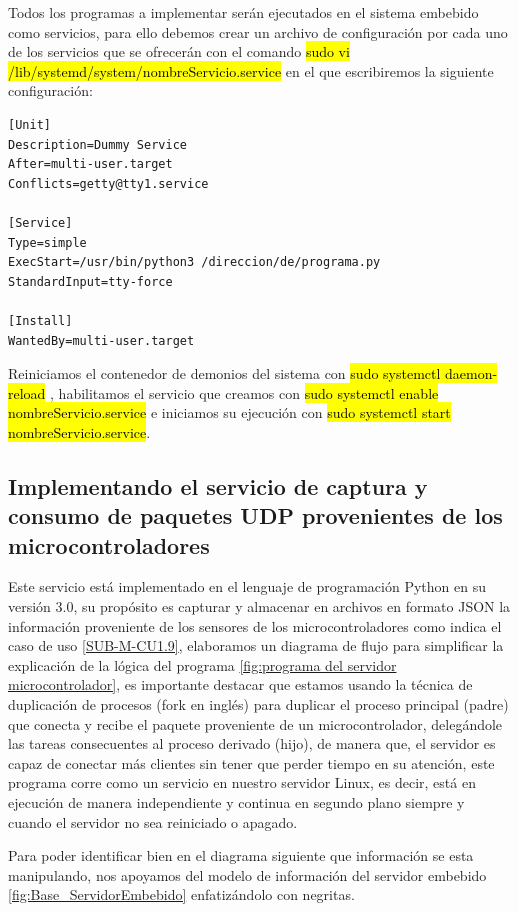 Todos los programas a implementar serán ejecutados en el sistema embebido como servicios, para ello debemos crear un archivo de configuración por cada uno de los servicios que se ofrecerán con el comando \hl{sudo vi /lib/systemd/system/nombreServicio.service} en el que escribiremos la siguiente configuración:

\begin{lstlisting}
[Unit]
Description=Dummy Service
After=multi-user.target
Conflicts=getty@tty1.service

[Service]
Type=simple
ExecStart=/usr/bin/python3 /direccion/de/programa.py
StandardInput=tty-force

[Install]
WantedBy=multi-user.target
\end{lstlisting}

Reiniciamos el contenedor de demonios del sistema con \hl{sudo systemctl daemon-reload} , habilitamos el servicio que creamos con \hl{sudo systemctl enable nombreServicio.service} e iniciamos su ejecución con \hl{sudo systemctl start nombreServicio.service}.

\subsection{Implementando el servicio de captura y consumo de paquetes UDP provenientes de los microcontroladores}

Este servicio está implementado en el lenguaje de programación Python en su versión 3.0, su propósito es capturar y almacenar en archivos en formato JSON la información proveniente de los sensores de los microcontroladores como indica el caso de uso \ref{SUB-M-CU1.9}, elaboramos un diagrama de flujo para simplificar la explicación de la lógica del programa \ref{fig:programa del servidor microcontrolador}, es importante destacar que estamos usando la técnica de duplicación de procesos (fork en inglés) para duplicar el proceso principal (padre) que conecta y recibe el paquete proveniente de un microcontrolador, delegándole las tareas consecuentes al proceso derivado (hijo), de manera que, el servidor es capaz de conectar más clientes sin tener que perder tiempo en su atención, este programa corre como un servicio en nuestro servidor Linux, es decir, está en ejecución de manera independiente y continua en segundo plano siempre y cuando el servidor no sea reiniciado o apagado.

Para poder identificar bien en el diagrama siguiente que información se esta manipulando, nos apoyamos del modelo de información del servidor embebido  \ref{fig:Base_ServidorEmbebido} enfatizándolo con negritas.

